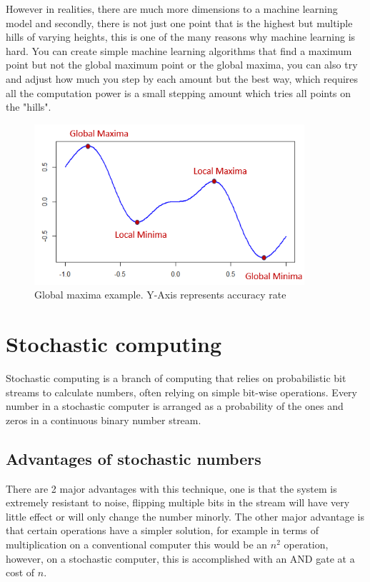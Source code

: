 \documentclass[a4paper,oneside,phd,etd]{BYUPhys}
\begin{document}
However in realities, there are much more dimensions to a machine learning model and secondly, there is not just one point that is the highest but multiple hills of varying heights, this is one of the many reasons why machine learning is hard. You can create simple machine learning algorithms that find a maximum point but not the global maximum point or the global maxima, you can also try and adjust how much you step by each amount but the best way, which requires all the computation power is a small stepping amount which tries all points on the "hills". 
\begin{figure}[H]
\centering
\includegraphics[width=10cm]{pictures/global_minima.png}
\caption{Global maxima example.
Y-Axis represents accuracy rate}
\label{fig:global_minima}
\end{figure}

\section{Stochastic computing}
Stochastic computing is a branch of computing that relies on probabilistic bit streams to calculate numbers, often relying on simple bit-wise operations. Every number in a stochastic computer is arranged as a probability of the ones and zeros in a continuous binary number stream. 

\subsection{Advantages of stochastic numbers}
There are 2 major advantages with this technique, one is that the system is extremely resistant to noise, flipping multiple bits in the stream will have very little effect or will only change the number minorly. The other major advantage is that certain operations have a simpler solution, for example in terms of multiplication on a conventional computer this would be an $n^2$ operation, however, on a stochastic computer, this is accomplished with an AND gate at a cost of $n$.
\end{document}
